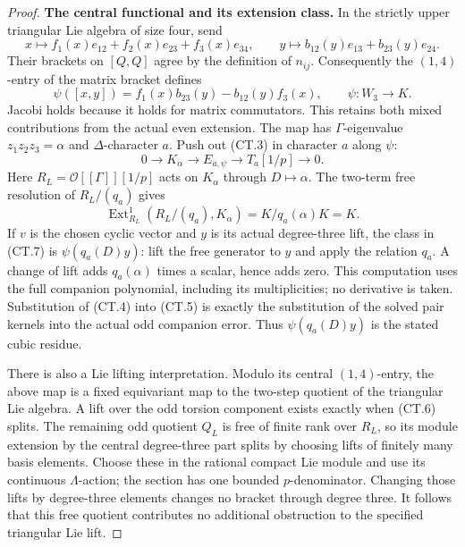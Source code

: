 \documentclass[11pt,a4paper]{article}
\theoremstyle{definition}
\begin{document}
\begin{proof}
\par\medskip\noindent\textbf{The central functional and its extension class.}
In the strictly upper triangular Lie algebra of size four, send
\[
 x\longmapsto f_1(x)e_{12}+f_2(x)e_{23}+f_3(x)e_{34},\qquad
 y\longmapsto b_{12}(y)e_{13}+b_{23}(y)e_{24}.
\]
Their brackets on \([Q,Q]\) agree by the definition of \(n_{ij}\).
Consequently the \((1,4)\)-entry of the matrix bracket defines
\[
 \psi([x,y])=f_1(x)b_{23}(y)-b_{12}(y)f_3(x),\qquad
 \psi:W_3\longrightarrow K.
 \tag{CT.5}
\]
Jacobi holds because it holds for matrix commutators. This retains both
mixed contributions from the actual even extension. The map has
\(\Gamma\)-eigenvalue \(z_1z_2z_3=\alpha\) and \(\Delta\)-character
\(a\). Push out (CT.3) in character \(a\) along \(\psi\):
\[
 0\longrightarrow K_\alpha\longrightarrow E_{a,\psi}
 \longrightarrow T_a[1/p]\longrightarrow0.
 \tag{CT.6}
\]
Here \(R_L=\mathcal O[[\Gamma]][1/p]\) acts on \(K_\alpha\) through
\(D\mapsto\alpha\). The two-term free resolution of
\(R_L/(q_a)\) gives
\[
 \operatorname{Ext}^1_{R_L}(R_L/(q_a),K_\alpha)
   =K/q_a(\alpha)K=K.
 \tag{CT.7}
\]
If \(v\) is the chosen cyclic vector and \(y\) is its actual
degree-three lift, the class in (CT.7) is
\(\psi(q_a(D)y)\): lift the free generator to \(y\) and apply the
relation \(q_a\). A change of lift adds \(q_a(\alpha)\) times a
scalar, hence adds zero. This computation uses the full companion
polynomial, including its multiplicities; no derivative is taken.
Substitution of (CT.4) into (CT.5) is exactly the substitution of the
solved pair kernels into the actual odd companion error. Thus
\(\psi(q_a(D)y)\) is the stated cubic residue.

There is also a Lie lifting interpretation. Modulo its central
\((1,4)\)-entry, the above map is a fixed equivariant map to the
two-step quotient of the triangular Lie algebra. A lift over the odd
torsion component exists exactly when (CT.6) splits. The remaining
odd quotient \(Q_L\) is free of finite rank over \(R_L\), so its
module extension by the central degree-three part splits by choosing
lifts of finitely many basis elements. Choose these in the rational
compact Lie module and use its continuous \(\Lambda\)-action; the
section has one bounded \(p\)-denominator. Changing those lifts by
degree-three elements changes no bracket through degree three.
It follows that this free quotient contributes no additional
obstruction to the specified triangular Lie lift.
\end{proof}
\end{document}
